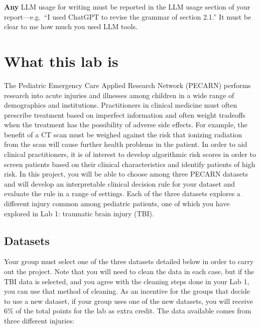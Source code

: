 \documentclass[letterpaper,12pt]{article}
\begin{document}
\textbf{Any} LLM usage for writing must be reported in the LLM usage section of your report---e.g.~``I used ChatGPT to revise the grammar of section 2.1.'' It must be clear to me how much you used LLM tools.

\section{What this lab is}

The Pediatric Emergency Care Applied Research Network (PECARN) performs research into acute injuries and illnesses among children in a wide range of demographics and institutions. Practitioners in clinical medicine must often prescribe treatment based on imperfect information and often weight tradeoffs when the treatment has the possibility of adverse side effects. For example, the benefit of a CT scan must be weighed against the risk that ionizing radiation from the scan will cause further health problems in the patient. In order to aid clinical practitioners, it is of interest to develop algorithmic risk scores in order to screen patients based on their clinical characteristics and identify patients of high risk. In this project, you will be able to choose among three PECARN datasets and will develop an interpretable clinical decision rule for your dataset and evaluate the rule in a range of settings. Each of the three datasets explores a different injury common among pediatric patients, one of which you have explored in Lab 1: traumatic brain injury (TBI).

\subsection{Datasets}

Your group must select one of the three datasets detailed below in order to carry out the project. Note that you will need to clean the data in each case, but if the TBI data is selected, and you agree with the cleaning steps done in your Lab 1, you can use that method of cleaning. As an incentive for the groups that decide to use a new dataset, if your group uses one of the new datasets, you will receive 6\% of the total points for the lab as extra credit. The data available comes from three different injuries:
\end{document}
